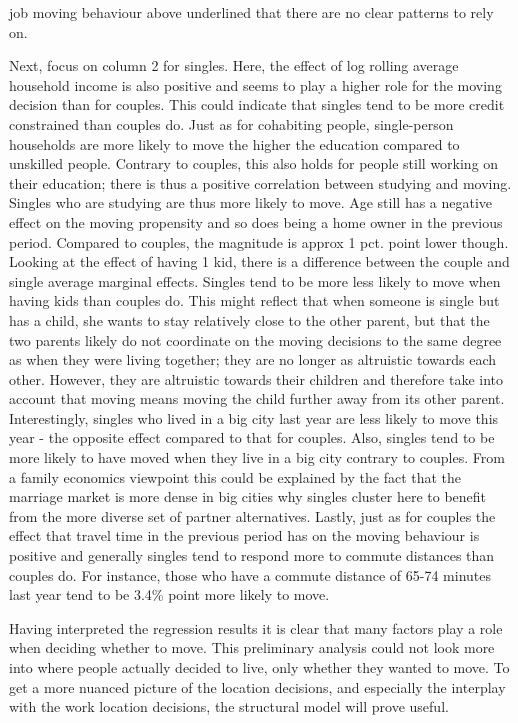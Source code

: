 job moving behaviour above underlined that there are no clear patterns to rely on. 

Next, focus on column 2 for singles. Here, the effect of log rolling average household income is also positive and seems to play a higher role for the moving decision than for couples. This could indicate that singles tend to be more credit constrained than couples do. Just as for cohabiting people, single-person households are more likely to move the higher the education compared to unskilled people. Contrary to couples, this also holds for people still working on their education; there is thus a positive correlation between studying and moving. Singles who are studying are thus more likely to move. Age still has a negative effect on the moving propensity and so does being a home owner in the previous period. Compared to couples, the magnitude is approx 1 pct. point lower though. Looking at the effect of having 1 kid, there is a difference between the couple and single average marginal effects. Singles tend to be more less likely to move when having kids than couples do. This might reflect that when someone is single but has a child, she wants to stay relatively close to the other parent, but that the two parents likely do not coordinate on the moving decisions to the same degree as when they were living together; they are no longer as altruistic towards each other. However, they are altruistic towards their children and therefore take into account that moving means moving the child further away from its other parent. Interestingly, singles who lived in a big city last year are less likely to move this year - the opposite effect compared to that for couples. Also, singles tend to be more likely to have moved when they live in a big city contrary to couples. From a family economics viewpoint this could be explained by the fact that the marriage market is more dense in big cities why singles cluster here to benefit from the more diverse set of partner alternatives. Lastly, just as for couples the effect that travel time in the previous period has on the moving behaviour is positive and generally singles tend to respond more to commute distances than couples do. For instance, those who have a commute distance of 65-74 minutes last year tend to be 3.4\% point more likely to move. 

Having interpreted the regression results it is clear that many factors play a role when deciding whether to move. This preliminary analysis could not look more into where people actually decided to live, only whether they wanted to move. To get a more nuanced picture of the location decisions, and especially the interplay with the work location decisions, the structural model will prove useful. 

